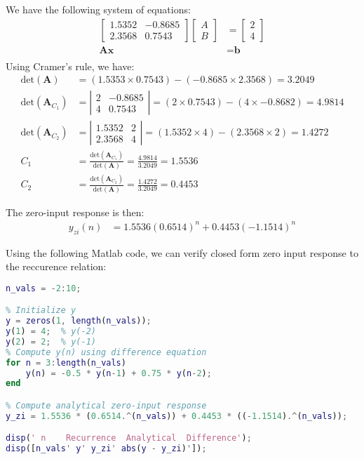 \documentclass{article}
\begin{document}
We have the following system of equations:
\begin{align*}
    \begin{bmatrix}
        1.5352 & -0.8685 \\
        2.3568 & 0.7543
    \end{bmatrix} \begin{bmatrix}
        A \\ B
    \end{bmatrix} &= \begin{bmatrix}
        2 \\ 4
    \end{bmatrix} \\
    \textbf{A}\textbf{x} &= \textbf{b} \\
\end{align*}
Using Cramer's rule, we have:
\begin{align*}
    \text{det}(\textbf{A}) &= (1.5353 \times 0.7543) - (-0.8685 \times 2.3568) = 3.2049 \\
    \text{det}(\textbf{A}_{C_1}) &= \left|
        \begin{matrix}
            2 & -0.8685 \\
            4 & 0.7543
        \end{matrix}
    \right| = (2\times0.7543) - (4 \times -0.8682) = 4.9814 \\
    \text{det}(\textbf{A}_{C_2}) &= \left|
        \begin{matrix}
            1.5352 & 2 \\
            2.3568 & 4
        \end{matrix}
    \right| = (1.5352 \times 4) - (2.3568 \times 2) = 1.4272 \\
    C_1 &= \frac{\text{det}(\textbf{A}_{C_1})}{\text{det}(\textbf{A})} = \frac{4.9814}{3.2049} = 1.5536 \\
    C_2 &= \frac{\text{det}(\textbf{A}_{C_2})}{\text{det}(\textbf{A})} = \frac{1.4272}{3.2049} = 0.4453
\end{align*}

The zero-input response is then:
\begin{align*}
    y_{zi}(n) &= 1.5536\left(0.6514\right)^n + 0.4453\left(-1.1514\right)^n
\end{align*}

Using the following Matlab code, we can verify closed form zero input response to the reccurence relation:
\begin{lstlisting}[language=MATLAB]
n_vals = -2:10; 

% Initialize y 
y = zeros(1, length(n_vals));  
y(1) = 4;  % y(-2)
y(2) = 2;  % y(-1)
% Compute y(n) using difference equation
for n = 3:length(n_vals)
    y(n) = -0.5 * y(n-1) + 0.75 * y(n-2);
end

% Compute analytical zero-input response
y_zi = 1.5536 * (0.6514.^(n_vals)) + 0.4453 * ((-1.1514).^(n_vals));

disp(' n    Recurrence  Analytical  Difference');
disp([n_vals' y' y_zi' abs(y - y_zi)']);
\end{lstlisting}
\end{document}
